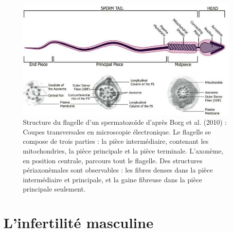 \documentclass[12pt,twoside]{reedthesis}
\theoremstyle{definition}
\theoremstyle{definition}
\theoremstyle{remark}
\begin{document}
  \begin{figure}
  
  {\centering \includegraphics[scale=.55]{figure/sperm2} 
  
  }
  
  \caption[Structure du flagelle d’un spermatozoïde]{Structure du flagelle d’un spermatozoïde d'après Borg et al. (2010) : Coupes transversales en microscopie électronique. Le flagelle se compose de trois parties : la pièce intermédiaire, contenant les mitochondries, la pièce principale et la pièce terminale. L’axonème, en position centrale, parcours tout le flagelle. Des structures périaxonèmales sont observables : les fibres denses dans la pièce intermédiaire et principale, et la gaine fibreuse dans la pièce principale seulement.}\label{fig:flagelle}
  \end{figure}
  
  \newpage
  
  \section{L'infertilité masculine}\label{linfertilite-masculine}
  
\end{document}
